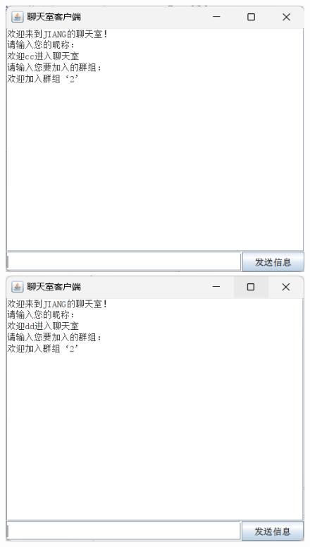 \documentclass[UTF8,12pt]{article}
\begin{document}
\begin{figure}[htbp]
	\begin{minipage}{0.3\linewidth}
		\centering
		\includegraphics[width=0.9\linewidth]{img/5.png}
	\end{minipage}
	\begin{minipage}{0.3\linewidth}
		\centering
		\includegraphics[width=0.9\linewidth]{img/6.png}
	\end{minipage}
\end{figure}
\end{document}
